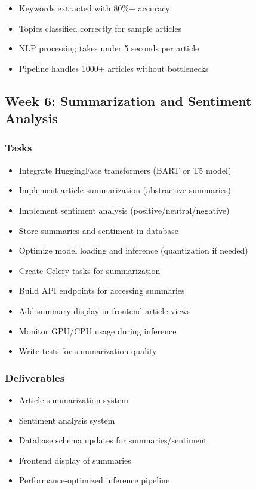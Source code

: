 \documentclass[12pt,oneside]{report}
\begin{document}
\begin{itemize}
    \item Keywords extracted with 80\%+ accuracy
    \item Topics classified correctly for sample articles
    \item NLP processing takes under 5 seconds per article
    \item Pipeline handles 1000+ articles without bottlenecks
\end{itemize}

\subsection{Week 6: Summarization and Sentiment Analysis}

\subsubsection{Tasks}

\begin{itemize}
    \item Integrate HuggingFace transformers (BART or T5 model)
    \item Implement article summarization (abstractive summaries)
    \item Implement sentiment analysis (positive/neutral/negative)
    \item Store summaries and sentiment in database
    \item Optimize model loading and inference (quantization if needed)
    \item Create Celery tasks for summarization
    \item Build API endpoints for accessing summaries
    \item Add summary display in frontend article views
    \item Monitor GPU/CPU usage during inference
    \item Write tests for summarization quality
\end{itemize}

\subsubsection{Deliverables}

\begin{itemize}
    \item Article summarization system
    \item Sentiment analysis system
    \item Database schema updates for summaries/sentiment
    \item Frontend display of summaries
    \item Performance-optimized inference pipeline
\end{itemize}
\end{document}
